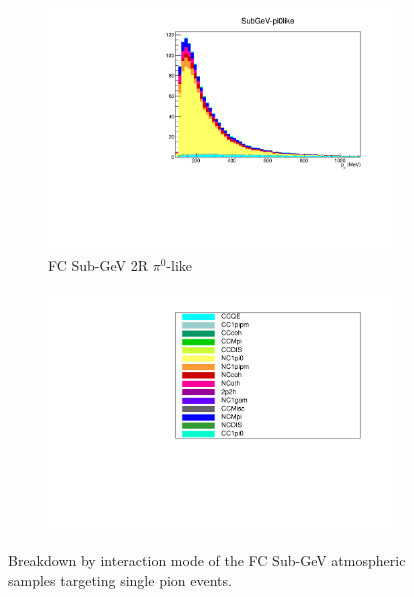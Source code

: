 \begin{figure}[ht]
\begin{subfigure}[t]{0.49\textwidth}
    \includegraphics[width=\textwidth, trim= 0 0 0 30, clip]{Figures/Selections/AtmosphericByMode/SubGeV-pi0like_LepMom.pdf}
    \caption{FC Sub-GeV 2R $\pi^{0}$-like}
    \end{subfigure}
    \begin{subfigure}[t]{0.49\textwidth}
    \includegraphics[page=1,width=\textwidth, trim= 0 0 0 30, clip]{Figures/Selections/AtmosphericByMode/Legend.pdf}
    \end{subfigure}
    \caption{Breakdown by interaction mode of the FC Sub-GeV atmospheric samples targeting single pion events.}
    \label{fig:SKSamples:FCSubGeVCC1pi}
\end{figure}

\clearpage
